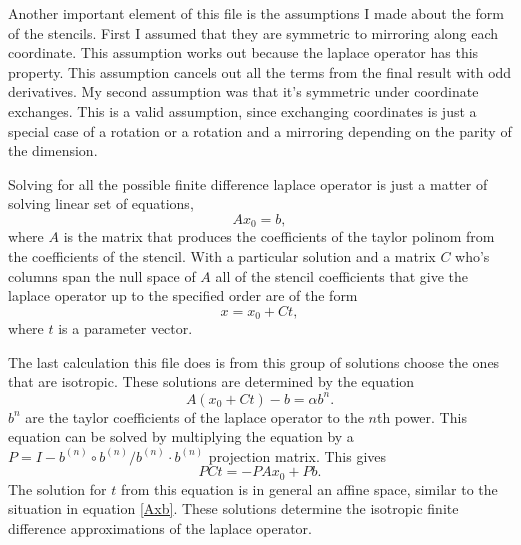 \documentclass[pdftex,12pt,a4paper]{article}
\begin{document}
		Another important element of this file is the assumptions I made about the form of the stencils. First I assumed that they are symmetric to mirroring along each coordinate. This assumption works out because the laplace operator has this property. This assumption cancels out all the terms from the final result with odd derivatives. My second assumption was that it's symmetric under coordinate exchanges. This is a valid assumption, since exchanging coordinates is just a special case of a rotation or a rotation and a mirroring depending on the parity of the dimension.
		
		Solving for all the possible finite difference laplace operator is just a matter of solving linear set of equations, 
		\begin{equation}
			Ax_0=b,
			\label{Axb}
		\end{equation}
		where $A$ is the matrix that produces the coefficients of the taylor polinom from the coefficients of the stencil. With a particular solution and a matrix $C$ who's columns span the null space of $A$ all of the stencil coefficients that give the laplace operator up to the specified order are of the form
		\begin{equation}
			x = x_0 + Ct,
			\label{laplaceCoeffs}
		\end{equation}
		where $t$ is a parameter vector.
		
		The last calculation this file does is from this group of solutions choose the ones that are isotropic. These solutions are determined by the equation
		\begin{equation}
			A(x_0 + Ct) - b = \alpha b^{n}.
		\end{equation}
		$b^{n}$ are the taylor coefficients of the laplace operator to the $n$th power. This equation can be solved by multiplying the equation by a $P = I - b^{(n)} \circ b^{(n)} / b^{(n)} \cdot b^{(n)}$ projection matrix. This gives
		\begin{equation}
			PCt = - PAx_0 + Pb.
		\end{equation}
		The solution for $t$ from this equation is in general an affine space, similar to the situation in equation \ref{Axb}. These solutions determine the isotropic finite difference approximations of the laplace operator.
\end{document}

